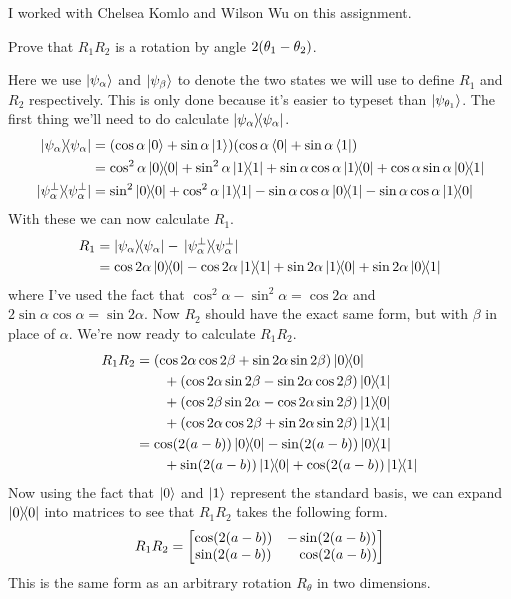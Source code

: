 \documentclass[boxes,pages]{homework}
\begin{document}
\noindent
I worked with Chelsea Komlo and Wilson Wu on this assignment.

\begin{problem}
Prove that $R_1R_2$ is a rotation by angle $2\qty(\theta_1 - \theta_2)$.
\end{problem}

\begin{solution}
	Here we use $\ket{\psi_\alpha}$ and $\ket{\psi_\beta}$ to denote the two states we will use to define $R_1$ and $R_2$ respectively.
	This is only done because it's easier to typeset than $\ket{\psi_{\theta_1}}$.
	The first thing we'll need to do calculate $\ketbra{\psi_\alpha}$.
	\begin{align*}
		\ketbra{\psi_\alpha}        & = \qty(\cos\alpha\ket{0} + \sin\alpha\ket{1})\qty(\cos\alpha\bra{0} + \sin\alpha\bra{1})                                  \\
		                            & = \cos^2\alpha\ketbra{0} + \sin^2\alpha\ketbra{1} + \sin\alpha\cos\alpha\ketbra{1}{0} + \cos\alpha\sin\alpha\ketbra{0}{1} \\
		\ketbra*{\psi_\alpha^\perp} & = \sin^2\ketbra{0} + \cos^2\alpha\ketbra{1} - \sin\alpha\cos\alpha\ketbra{0}{1} - \sin\alpha\cos\alpha\ketbra{1}{0}
	\end{align*}
	With these we can now calculate $R_1$.
	\begin{align*}
		R_1 & = \ketbra{\psi_\alpha} - \ketbra*{\psi_\alpha^\perp}                                                  \\
		    & = \cos2\alpha\ketbra{0} - \cos2\alpha\ketbra{1} + \sin2\alpha\ketbra{1}{0} + \sin2\alpha\ketbra{0}{1}
	\end{align*}
	where I've used the fact that $\cos^2\alpha - \sin^2\alpha = \cos2\alpha$ and $2\sin\alpha\cos\alpha = \sin2\alpha$.
	Now $R_2$ should have the exact same form, but with $\beta$ in place of $\alpha$.
	We're now ready to calculate $R_1R_2$.
	\begin{align*}
		R_1R_2 & = \qty(\cos2\alpha\cos2\beta + \sin2\alpha\sin2\beta)\ketbra{0}           \\
		       & \qquad + \qty(\cos2\alpha\sin2\beta - \sin2\alpha\cos2\beta)\ketbra{0}{1} \\
		       & \qquad + \qty(\cos2\beta\sin2\alpha - \cos2\alpha\sin2\beta)\ketbra{1}{0} \\
		       & \qquad + \qty(\cos2\alpha\cos2\beta + \sin2\alpha\sin2\beta)\ketbra{1}    \\
		       & = \cos(2(a-b))\ketbra{0} - \sin(2(a-b))\ketbra{0}{1}                      \\
		       & \qquad + \sin(2(a-b))\ketbra{1}{0} + \cos(2(a-b))\ketbra{1}
	\end{align*}
	Now using the fact that $\ket{0}$ and $\ket{1}$ represent the standard basis, we can expand $\ketbra{0}$ into matrices to see that $R_1R_2$ takes the following form.
	\begin{equation*}
		R_1R_2 = \mqty[\cos(2(a-b)) & -\sin(2(a-b)) \\ \sin(2(a-b)) & \phantom{-}\cos(2(a-b))]
	\end{equation*}
	This is the same form as an arbitrary rotation $R_\theta$ in two dimensions.
\end{solution}
\end{document}
